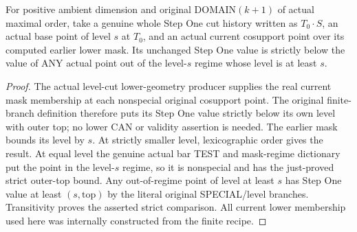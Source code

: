 \begin{theorem}
\label{hir:original-finite-stepone-cut-earlier-mask-strict-value}
\leanok
For positive ambient dimension and original DOMAIN$(k+1)$ of actual
maximal order, take a genuine whole Step One cut history written as
$T_0\cdot S$, an actual base point of level $s$ at $T_0$, and an actual
current cosupport point over its computed earlier lower mask. Its
unchanged Step One value is strictly below the value of ANY actual point
out of the level-$s$ regime whose level is at least $s$.
\end{theorem}
\begin{proof}
The actual level-cut lower-geometry producer supplies the real current
mask membership at each nonspecial original cosupport point. The original
finite-branch definition therefore puts its Step One value strictly below
its own level with outer top; no lower CAN or validity assertion is needed.
The earlier mask bounds its level by $s$. At strictly smaller level,
lexicographic order gives the result. At equal level the genuine actual
bar TEST and mask-regime dictionary put the point in the level-$s$ regime,
so it is nonspecial and has the just-proved strict outer-top bound. Any
out-of-regime point of level at least $s$ has Step One value at least
$(s,\mathrm{top})$ by the literal original SPECIAL/level branches.
Transitivity proves the asserted strict comparison. All current lower
membership used here was internally constructed from the finite recipe.
\end{proof}

